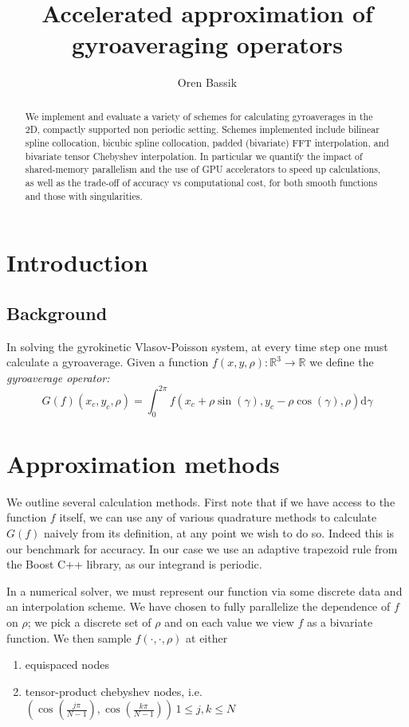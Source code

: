\documentclass{article}
\theoremstyle{theorem}
\theoremstyle{definition}
\begin{document}
\title{Accelerated approximation of gyroaveraging operators}
\author{Oren Bassik}

\maketitle

\begin{abstract}
We implement and evaluate a variety of schemes for calculating gyroaverages in the 2D, compactly supported non periodic setting.  Schemes implemented include bilinear spline collocation, bicubic spline collocation, padded (bivariate) FFT interpolation, and bivariate tensor Chebyshev interpolation. In particular we quantify the impact of shared-memory parallelism and the use of GPU accelerators to speed up calculations, as well as the trade-off of accuracy vs computational cost, for both smooth functions and those with singularities.  \end{abstract}


\noindent
\section{Introduction}
\subsection*{Background}
In solving the gyrokinetic Vlasov-Poisson system, at every time step one must calculate a gyroaverage.  Given a function $f(x,y,\rho) : \mathbb{R}^3 \to \mathbb{R}$ we define the \textit{gyroaverage operator:} 
 \[ G(f)(x_c,y_c,\rho) = \int_0^{2\pi}  f(x_c + \rho \sin(\gamma), y_c - \rho \cos(\gamma), \rho)  \mathrm{d} \gamma\]

\section{Approximation methods}

We outline several calculation methods.  First note that if we have access to the function $f$ itself, we can use any of various quadrature methods to calculate $G(f)$ naively from its definition, at any point we wish to do so.  Indeed this is our benchmark for accuracy.  In our case we use an adaptive trapezoid rule from the Boost C++ library, as our integrand is periodic.

In a numerical solver, we must represent our function via some discrete data and an interpolation scheme.  We have chosen to fully parallelize the dependence of $f$ on $\rho$; we pick a discrete set of $\rho$ and on each value we view $f$ as a bivariate function.  We then sample $f(\cdot, \cdot, \rho)$ at either \begin{enumerate}
	\item equispaced nodes 
	\item tensor-product chebyshev nodes, i.e. $\left(\cos\left(\frac{j\pi}{N-1}\right), \cos\left(\frac{k\pi}{N-1}\right) \right) \, 1 \leq j,k \leq N$
\end{enumerate}
\end{document}
